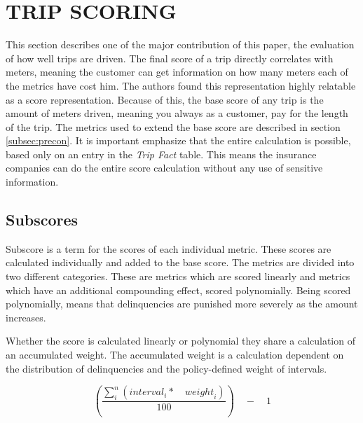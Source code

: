 \section{TRIP SCORING}\label{sec:trip}
This section describes one of the major contribution of this paper, the evaluation of how well trips are driven. The final score of a trip directly correlates with meters, meaning the customer can get information on how many meters each of the metrics have cost him. The authors found this representation highly relatable as a score representation.
Because of this, the base score of any trip is the amount of meters driven, meaning you always as a customer, pay for the length of the trip. The metrics used to extend the base score are described in section \ref{subsec:precon}.
It is important emphasize that the entire calculation is possible, based only on an entry in the \textit{Trip Fact} table. This means the insurance companies can do the entire score calculation without any use of sensitive information.

\subsection{Subscores} 
Subscore is a term for the scores of each individual metric. These scores are calculated individually and added to the base score. The metrics are divided into two different categories. These are metrics which are scored linearly and metrics which have an additional compounding effect, scored polynomially. Being scored polynomially, means that delinquencies are punished more severely as the amount increases.

Whether the score is calculated linearly or polynomial they share a calculation of an accumulated weight. The accumulated weight is a calculation dependent on the distribution of delinquencies and the policy-defined weight of intervals.

$$
\left( \frac { \sum _{ i }^{ n }{ \left( { interval }_{ i }*\quad { weight }_{ i } \right)  }  }{ 100 }  \right) \quad -\quad 1
$$

